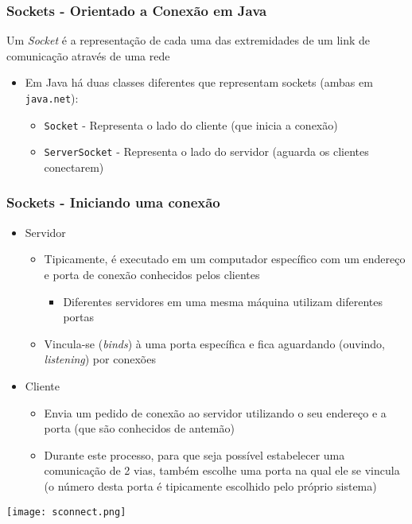 \documentclass[Ligatures=TeX,table,brazil,svgnames,usetotalslideindicator,comp
ress,10pt]{beamer}
\begin{document}
\begin{frame}
  \frametitle{Sockets - Orientado a Conexão em Java}
  Um \emph{Socket} é a representação de cada uma das extremidades de um link de comunicação através de uma rede
  \begin{itemize}
    \item Em Java há duas classes diferentes que representam sockets (ambas em \texttt{java.net}):
    \begin{itemize}
      \item \texttt{Socket} - Representa o lado do cliente (que inicia a conexão)
      \item \texttt{ServerSocket} - Representa o lado do servidor (aguarda os clientes conectarem)
    \end{itemize}
  \end{itemize}

\end{frame}

\begin{frame}
  \frametitle{Sockets - Iniciando uma conexão}
  \begin{itemize}

    \item Servidor
    \begin{itemize}
      \item Tipicamente, é executado em um computador específico com um endereço e porta de conexão conhecidos pelos clientes
      \begin{itemize}
        \item Diferentes servidores em uma mesma máquina utilizam diferentes portas
      \end{itemize}
      \item Vincula-se (\emph{binds}) à uma porta específica e fica aguardando (ouvindo, \emph{listening}) por conexões
    \end{itemize}

    \item Cliente
    \begin{itemize}
      \item Envia um pedido de conexão ao servidor utilizando o seu endereço e a porta (que são conhecidos de antemão)
      \item Durante este processo, para que seja possível estabelecer
        uma comunicação de 2 vias, também escolhe uma porta na qual
        ele se vincula (o número desta porta é tipicamente escolhido
        pelo próprio sistema)
    \end{itemize}
  \end{itemize}
  \centering
  \texttt{[image: sconnect.png]}
\end{frame}
\end{document}
